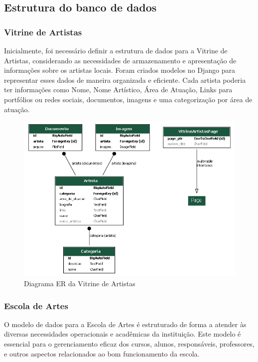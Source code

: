 \subsection{Estrutura do banco de dados}

\subsubsection{Vitrine de Artistas}

Inicialmente, foi necessário definir a estrutura de dados para a Vitrine de Artistas, considerando as necessidades de armazenamento e apresentação de informações sobre os artistas locais. Foram criados modelos no Django para representar esses dados de maneira organizada e eficiente. Cada artista poderia ter informações como Nome, Nome Artístico, Área de Atuação, Links para portfólios ou redes sociais, documentos, imagens e uma categorização por área de atuação.

\begin{figure}[htb]
	\caption{\label{fig_grafico}Diagrama ER da Vitrine de Artistas}
	\begin{center}
	    \includegraphics[scale=0.3]{./img/er_diagram_vitrine.png}
	\end{center}
\end{figure}



\subsubsection{Escola de Artes}

O modelo de dados para a Escola de Artes é estruturado de forma a atender às diversas necessidades operacionais e acadêmicas da instituição. Este modelo é essencial para o gerenciamento eficaz dos cursos, alunos, responsáveis, professores, e outros aspectos relacionados ao bom funcionamento da escola.

